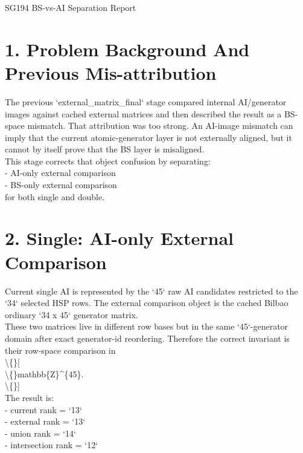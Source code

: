 \documentclass[11pt]{article}
\begin{document}
        \begin{center}
        {\LARGE SG194 BS-vs-AI Separation Report}
        \end{center}
        \section*{1. Problem Background And Previous Mis-attribution}

The previous `external\_matrix\_final` stage compared internal AI/generator images against cached external matrices and then described the result as a BS-space mismatch. That attribution was too strong. An AI-image mismatch can imply that the current atomic-generator layer is not externally aligned, but it cannot by itself prove that the BS layer is misaligned.\\

This stage corrects that object confusion by separating:\\

- AI-only external comparison\\
- BS-only external comparison\\

for both single and double.\\

\section*{2. Single: AI-only External Comparison}

Current single AI is represented by the `45` raw AI candidates restricted to the `34` selected HSP rows. The external comparison object is the cached Bilbao ordinary `34 x 45` generator matrix.\\

These two matrices live in different row bases but in the same `45`-generator domain after exact generator-id reordering. Therefore the correct invariant is their row-space comparison in\\
\textbackslash\{\}[\\
\textbackslash\{\}mathbb\{Z\}\textasciicircum{}\{45\}.\\
\textbackslash\{\}]\\

The result is:\\
- current rank = `13`\\
- external rank = `13`\\
- union rank = `14`\\
- intersection rank = `12`\\
\end{document}
